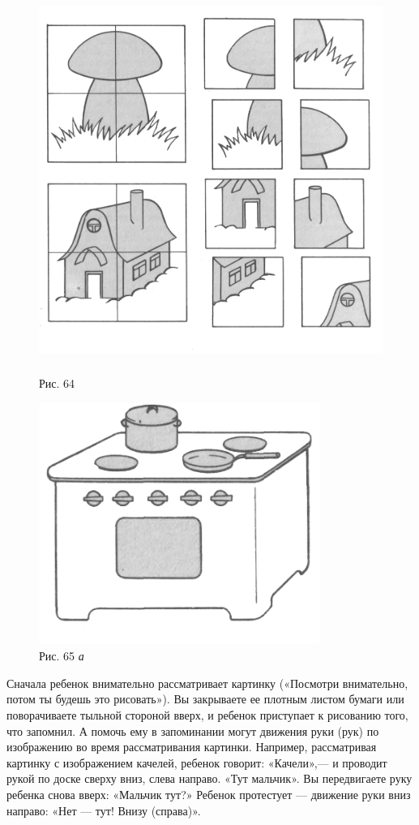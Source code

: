 \documentclass[a5paper]{book}
\renewcommand{\emph}[1]{\textit{#1}}
\begin{document}
\begin{figure}
\centering
\includegraphics[width=4.90972in,height=4.94306in]{media/media/image61.jpg}
\caption*{Рис. 64}
\end{figure}

\begin{figure}
\centering
\includegraphics[width=3.60733in,height=3.10321in]{media/media/image62.jpg}
\caption*{Рис. 65 \emph{а}}
\end{figure}

Сначала ребенок внимательно рассматривает картинку («Посмотри
внимательно, потом ты будешь это рисовать»). Вы закрываете ее плотным
листом бумаги или поворачиваете тыльной стороной вверх, и ребенок
приступает к рисованию того, что запомнил. А помочь ему в запоминании
могут движения руки (рук) по изображению во время рассматривания
картинки. Например, рассматривая картинку с изображением качелей,
ребенок говорит: «Качели»,--- и проводит рукой по доске сверху вниз,
слева направо. «Тут мальчик». Вы передвигаете руку ребенка снова вверх:
«Мальчик тут?» Ребенок протестует --- движение руки вниз направо: «Нет
--- тут! Внизу (справа)».
\end{document}
